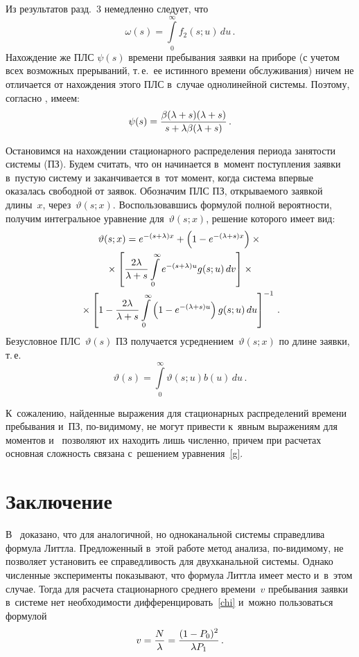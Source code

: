 \begin{multicols}{2}
\noindent Из результатов разд.~3 немедленно следует, что
$$
\omega(s)=\int\limits_0^\infty f_2(s;u)\,du\,. 
$$
Нахождение же ПЛС $\psi(s)$ времени пребывания заявки на приборе 
(с учетом всех возможных прерываний, т.\,е.\ ее истинного времени 
обслуживания) 
ничем не отличается от на\-хож\-де\-ния этого ПЛС в~случае однолинейной 
системы. Поэтому, согласно 
\cite[формула (13)]{xx2}, имеем:
$$
\psi(s)
=
\displaystyle\frac{\displaystyle \beta(\lambda+s) (\lambda + s) 
\mathstrut}{\displaystyle s + \lambda \beta(\lambda+s)\mathstrut}\,.
$$

Остановимся на нахождении стационарного распределения периода занятости 
системы (ПЗ).
Будем считать, что он начинается в~момент поступления заявки в~пустую 
систему 
и заканчивается в~тот момент, когда система впервые оказалась свободной 
от заявок. 
Обозначим ПЛС ПЗ, открываемого заявкой длины~$x$,
через~$\vartheta(s;x)$. Воспользовавшись формулой полной вероятности, 
получим интегральное уравнение для~$\vartheta(s;x)$, решение 
которого имеет вид:
\begin{multline*}
\vartheta(s;x)= e^{-(s+\lambda)x}+\left(1-e^{-(\lambda+s) x}\right) %
\times{}\\
{}\times\left[\fr{2\lambda}{\lambda+s}
\int\limits_{0}^\infty
e^{-(s+\lambda)u}
g(s;u)\,dv\right]\times{}\\
{}\times
\left[1- 
\fr{2 \lambda}{\lambda+s} \int\limits_{0}^\infty
\left(1-e^{-(\lambda+s) u}\right)
g(s;u)\,du\right]^{-1}\,.
\end{multline*}
\noindent
Безусловное ПЛС~$\vartheta(s)$ ПЗ получается усреднением~$\vartheta(s;x)$ 
по длине заявки, т.\,е.\
$$
\vartheta(s)=\int\limits_0^\infty \vartheta(s;u)b(u)\,du\,.
$$

К~сожалению, найденные выражения для стационарных распределений
времени пребывания и~ПЗ, по-видимому, не могут 
привести к~явным выражениям для моментов и~
позволяют их находить лишь численно, 
причем при расчетах основная сложность связана с~решением 
уравнения~\eqref{g}. 


\section{Заключение}


В~\cite{xx2} доказано, что для аналогичной, но одноканальной 
системы справедлива формула Литтла. Предложенный в~этой работе 
метод анализа, по-видимому, не позволяет установить 
ее справедливость для двухканальной системы.
Однако чис\-лен\-ные эксперименты показывают, что формула Литтла имеет место 
и~в~этом случае. 
Тогда для расчета стационарного среднего времени~$v$ 
пребывания заявки в~системе нет необходимости 
дифференцировать~\eqref{chi} и~можно пользоваться формулой 
$$
v=\fr{N}{\lambda} =\fr{(1\hm-P_0)^2}{\lambda P_1}\,.
$$


\end{multicols}

